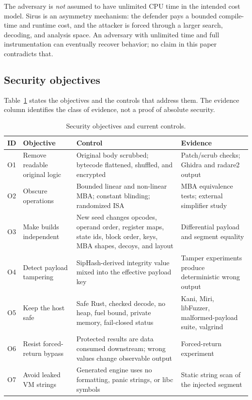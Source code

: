 The adversary is \emph{not} assumed to have unlimited CPU time in the intended
cost model. Sirus is an asymmetry mechanism: the defender pays a bounded
compile-time and runtime cost, and the attacker is forced through a larger
search, decoding, and analysis space. An adversary with unlimited time and full
instrumentation can eventually recover behavior; no claim in this paper
contradicts that.

\subsection{Security objectives}

Table~\ref{tab:objectives} states the objectives and the controls that address
them. The evidence column identifies the class of evidence, not a proof of
absolute security.

\begin{table}[htbp]
\centering
\small
\caption{Security objectives and current controls.}
\label{tab:objectives}
\begin{tabularx}{\textwidth}{@{}>{\raggedright\arraybackslash}p{}>{\raggedright\arraybackslash}p{}>{\raggedright\arraybackslash}p{}>{\raggedright\arraybackslash}X@{}}
\toprule
ID & Objective & Control & Evidence \\
\midrule
O1 & Remove readable original logic & Original body scrubbed; bytecode flattened, shuffled, and encrypted & Patch/scrub checks; Ghidra and radare2 output \\
O2 & Obscure operations & Bounded linear and non-linear MBA; constant blinding; randomized ISA & MBA equivalence tests; external simplifier study \\
O3 & Make builds independent & New seed changes opcodes, operand order, register maps, state ids, block order, keys, MBA shapes, decoys, and layout & Differential payload and segment equality \\
O4 & Detect payload tampering & SipHash-derived integrity value mixed into the effective payload key & Tamper experiments produce deterministic wrong output \\
O5 & Keep the host safe & Safe Rust, checked decode, no heap, fuel bound, private memory, fail-closed status & Kani, Miri, libFuzzer, malformed-payload suite, valgrind \\
O6 & Resist forced-return bypass & Protected results are data consumed downstream; wrong values change observable output & Forced-return experiment \\
O7 & Avoid leaked VM strings & Generated engine uses no formatting, panic strings, or libc symbols & Static string scan of the injected segment \\
\bottomrule
\end{tabularx}
\end{table}

